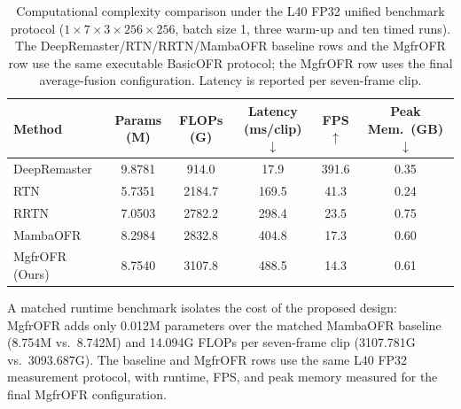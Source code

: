 \begin{table}[htbp]
\caption{Computational complexity comparison under the L40 FP32 unified benchmark protocol ($1{\times}7{\times}3{\times}256{\times}256$, batch size 1, three warm-up and ten timed runs). The DeepRemaster/RTN/RRTN/MambaOFR baseline rows and the MgfrOFR row use the same executable BasicOFR protocol; the MgfrOFR row uses the final average-fusion configuration. Latency is reported per seven-frame clip.\label{tab:complexity}}
\begin{tabularx}{\textwidth}{lCCCCC}
\toprule
\textbf{Method} & \textbf{Params (M)} & \textbf{FLOPs (G)} & \textbf{Latency (ms/clip)$\downarrow$} & \textbf{FPS$\uparrow$} & \textbf{Peak Mem.\ (GB)$\downarrow$} \\
\midrule
DeepRemaster~\cite{iizuka2019deepremaster}   & 9.8781 & 914.0  & 17.9  & 391.6 & 0.35 \\
RTN~\cite{wan2022rtn}                        & 5.7351 & 2184.7 & 169.5 & 41.3  & 0.24 \\
RRTN~\cite{lin2024rrtn}                      & 7.0503 & 2782.2 & 298.4 & 23.5  & 0.75 \\
MambaOFR~\cite{mao2025mambaofr}              & 8.2984 & 2832.8 & 404.8 & 17.3  & 0.60 \\
\midrule
MgfrOFR (Ours)                              & 8.7540 & 3107.8 & 488.5 & 14.3  & 0.61 \\
\bottomrule
\end{tabularx}
\end{table}

A matched runtime benchmark isolates the cost of the proposed design: MgfrOFR adds only 0.012M parameters over the matched MambaOFR baseline (8.754M vs.\ 8.742M) and 14.094G FLOPs per seven-frame clip (3107.781G vs.\ 3093.687G). The baseline and MgfrOFR rows use the same L40 FP32 measurement protocol, with runtime, FPS, and peak memory measured for the final MgfrOFR configuration.

\FloatBarrier
